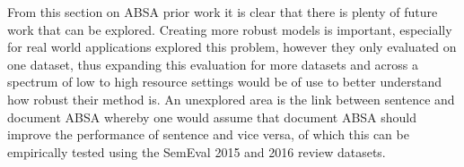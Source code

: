 From this section on ABSA prior work it is clear that there is plenty of future work that can be explored. Creating more robust models is important, especially for real world applications \citet{bao-etal-2019-attention} explored this problem, however they only evaluated on one dataset, thus expanding this evaluation for more datasets and across a spectrum of low to high resource settings would be of use to better understand how robust their method is. An unexplored area is the link between sentence and document ABSA whereby one would assume that document ABSA should improve the performance of sentence and vice versa, of which this can be empirically tested using the SemEval 2015 \citep{pontiki-etal-2015-semeval} and 2016 \citep{pontiki-etal-2016-semeval} review datasets.






